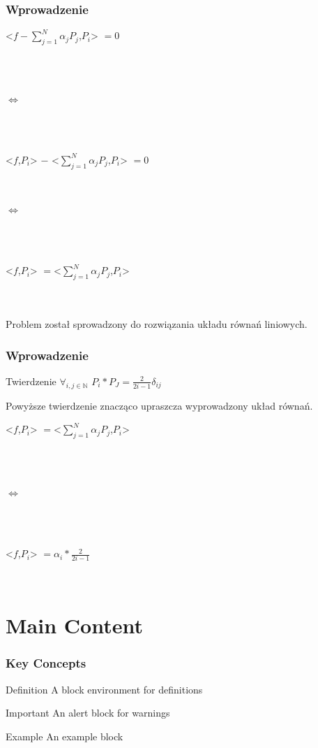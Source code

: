 \documentclass{beamer}
\begin{document}
\begin{frame}
\frametitle{Wprowadzenie}

\centerline{<$f - \sum\limits_{j=1}^{N}\alpha_j P_j$,$P_i$> $= 0$}\\~\\
\centerline{$\iff$}\\~\\
\centerline{<$f$,$P_i$>  $-$  <$\sum\limits_{j=1}^{N}\alpha_j P_j$,$P_i$> $= 0$}\\
\centerline{$\iff$}\\~\\
\centerline{<$f$,$P_i$>  $= $<$\sum\limits_{j=1}^{N}\alpha_j P_j$,$P_i$>}\\~\\

Problem został sprowadzony do rozwiązania układu równań liniowych.\\

\end{frame}

\begin{frame}
\frametitle{Wprowadzenie}
\begin{block}{Twierdzenie}
$\forall_{i,j \in \mathbb{N}}$ $P_i * P_J = \frac{2}{2i-1}\delta_{ij}$

\end{block}
Powyższe twierdzenie znacząco upraszcza wyprowadzony układ równań.\\
\centerline{<$f$,$P_i$>  $= $<$\sum\limits_{j=1}^{N}\alpha_j P_j$,$P_i$>}\\~\\
\centerline{$\iff$}\\~\\
\centerline{<$f$,$P_i$>  $= \alpha_i * \frac{2}{2i-1} $}\\

\end{frame}

\section{Main Content}
\begin{frame}
\frametitle{Key Concepts}
\begin{block}{Definition}
    A block environment for definitions
\end{block}
\begin{alertblock}{Important}
    An alert block for warnings
\end{alertblock}
\begin{exampleblock}{Example}
    An example block
\end{exampleblock}
\end{frame}
\end{document}
